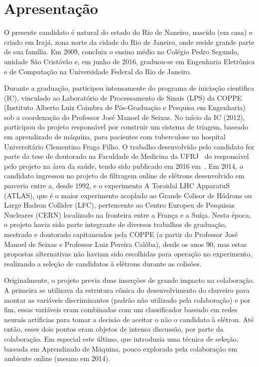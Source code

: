 


\section{Apresentação}\label{sec:apresentation}

O presente candidato é natural do estado do Rio de Naneiro, nascido 
(em casa) e criado em Irajá, zona norte da cidade do Rio de Janeiro, onde 
reside grande parte de sua família. Em 2009, concluiu o ensino médio no 
Colégio Pedro Segundo, unidade São Cristóvão e, em junho de 2016, graduou-se em Engenharia 
Eletrônica e de Computação na Universidade Federal do Rio de Janeiro.



Durante a graduação, participou intensamente do programa de iniciação 
cientifica (IC), vinculado ao Laboratório de Processamento de Sinais (LPS) da 
COPPE (Instituto Alberto Luiz Coimbra de Pós-Graduação e Pesquisa em Engenharia) 
sob a coordenação do Professor José Manoel de Seixas. No início da IC (2012), participou 
do projeto responsável por construir um sistema de triagem, baseado em aprendizado de 
máquina, para pacientes com tuberculose no hospital Universitário Clementino Fraga Filho. 
O trabalho desenvolvido pelo candidato fez parte da tese de doutorado na Faculdade
de Medicina da UFRJ~\cite{tese_fabio_aguiar} do responsável pelo projeto na área da saúde, 
tendo sido publicado em 2016 em~\cite{paper_tb_som}. 
Em 2014, o candidato ingressou no projeto de filtragem online de elétrons 
desenvolvido em parceria entre a, desde 1992, e o experimento A Toroidal LHC 
ApparatuS (ATLAS), que é o maior experimento acoplado ao Grande Colisor de Hádrons ou 
Large Hadron Collider (LFC), pertencente ao Centro Europeu de Pesquisas Nucleares (CERN) 
localizado na fronteira entre a França e a Suíça. Nesta época, o projeto havia sido parte 
integrante de diversos trabalhos de graduação, mestrado e doutorado capitaneados pela 
COPPE (a partir do Professor José Manoel de Seixas e Professor Luiz Pereira Calôba), desde 
os anos 90, mas estas propostas alternativas não haviam sido escolhidas para operação no 
experimento, realizando a seleção de candidatos à elétrons durante as colisões. 



Originalmente, o projeto previa duas inserções de grande impacto na colaboração. 
A primeira se utilizava da estrutura cônica do desenvolvimento do chuveiro para montar 
as variáveis discriminantes (padrão não utilizado pela colaboração) e por fim, essas 
variáveis eram combinadas com um classificador baseado em redes neurais artificias para 
tomar a decisão de aceitar o não o candidato à elétron. Até então, esses dois pontos eram 
objetos de intensa discussão, por parte da colaboração. Em especial este último, que 
introduzia uma técnica de seleção, baseada em Aprendizado de Máquina, pouco explorada pela 
colaboração em ambiente online (mesmo em 2014). 




